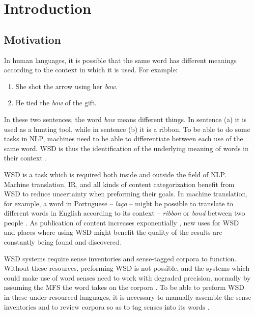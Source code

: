 \chapter{Introduction}

\section{Motivation}

In human languages, it is possible that the same word has different meanings
according to the context in which it is used. For example:

\begin{enumerate}[label=(\alph*)]
 \item She shot the arrow using her \textit{bow}.
 \item He tied the \textit{bow} of the gift.
\end{enumerate}

In these two sentences, the word \textit{bow} means different things. In
sentence (a) it is used as a hunting tool, while in sentence (b) it is a ribbon.
To be able to do some tasks in \ac{NLP}, machines need to be able to
differentiate between each use of the same word. \ac{WSD} is thus the
identification of the underlying meaning of words in their context
\cite{navigli2009word}.

\ac{WSD} is a task which is required both inside and outside the field of
\ac{NLP}. Machine translation, \ac{IR}, and all kinds of content categorization
benefit from \ac{WSD} to reduce uncertainty when preforming their goals. In
machine translation, for example, a word in Portuguese -- \textit{laço} -- might
be possible to translate to different words in English according to its context
-- \textit{ribbon} or \textit{bond} between two people \cite{navigli2009word}.
As publication of content increases exponentially \cite{james2016data}, new
uses for \ac{WSD} and places where using \ac{WSD} might benefit the quality of
the results are constantly being found and discovered.

\ac{WSD} systems require sense inventories and sense-tagged corpora to function.
Without these resources, preforming \ac{WSD} is not possible, and the systems
which could make use of word senses need to work with degraded precision,
normally by assuming the \ac{MFS} the word takes on the corpora \cite{TODO}.
To be able to preform \ac{WSD} in these under-resourced languages, it is
necessary to manually assemble the sense inventories and to review corpora so as
to tag senses into its words \cite{ng1997getting}.

